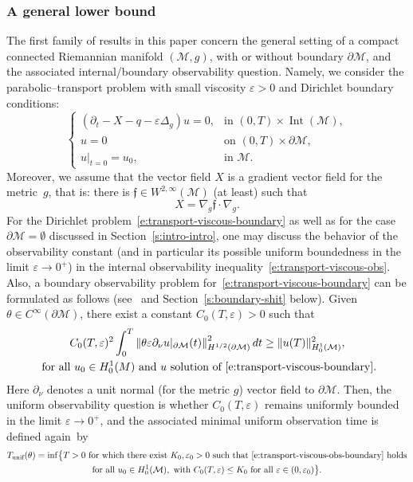 \documentclass[JEP,XML,SOM,Unicode]{cedram}
\newcommand{\unif}{\textup{unif}}
\theoremstyle{definition}
\newcommand{\M}{\ensuremath{\mathcal M}}
\newcommand{\f}{\ensuremath{\mathfrak{f}}}
\DeclareMathOperator{\Int}{Int}
\newcommand\nor[2]{\left\|#1\right\|_{#2}}
\let\d\partial
\let\eps\varepsilon
\let\q q
\begin{document}
\subsubsection{A general lower bound}
\label{s:sect-general}
The first family of results in this paper concern the general setting of a compact connected Riemannian manifold $(\M,g)$, with or without boundary $\d\M$, and the associated internal/boundary observability question. Namely, we consider the parabolic--transport problem with small viscosity $\eps>0$ and Dirichlet boundary conditions:
\begin{equation}
\label{e:transport-viscous-boundary}
\begin{cases}
(\d_t - X -\q - \eps \Delta_g ) u = 0, & \text{in } (0,T)\times\Int(\M), \\
u = 0 & \text{on } (0,T)\times \d\M, \\
u|_{t=0} = u_0, & \text{in } \M.
\end{cases}
\end{equation}
Moreover, we assume that the vector field $X$ is a gradient vector field for the metric~$g$, that is: there is $\f \in W^{2,\infty}(\M)$ (at least) such that
\[
X = \nabla_g \f \cdot \nabla_g.
\]
For the Dirichlet problem~\eqref{e:transport-viscous-boundary} as well as for the case $\d\M =\emptyset$ discussed in Section~\ref{s:intro-intro}, one may discuss the behavior of the observability constant (and in particular its possible uniform boundedness in the limit $\eps\to 0^+$) in the internal observability inequality~\eqref{e:transport-viscous-obs}.
Also, a boundary observability problem for~\eqref{e:transport-viscous-boundary} can be formulated as follows (see~\cite{GL:07} and Section~\ref{s:boundary-shit} below). Given $\theta \in C^\infty(\d\M)$, there exist a constant $C_0(T,\eps)>0$ such that
\begin{multline}
\label{e:transport-viscous-obs-boundary}
C_0(T,\eps)^2 \int_0^T\nor{ \theta \eps \d_{\nu} u|_{\d\M}(t)}{H^{1/2}(\d\M)}^2 dt \geq \|u (T)\|_{H^1_0(\M)}^2, \\
\text{ for all } u_0 \in H^1_0(M) \text{ and } u \text{ solution of~\eqref{e:transport-viscous-boundary}}.
\end{multline}
Here $\d_\nu$ denotes a unit normal (for the metric $g$) vector field to $\d\M$.
Then, the uniform observability question is whether $C_0(T,\eps)$ remains uniformly bounded in the limit $\eps\to 0^+$, and the associated minimal uniform observation time is defined again~by
\begin{multline*}
T_{\unif}(\theta) = \inf \bigl\{ T >0 \text{ for which there exist }K_0, \eps_0>0 \text{ such that~\eqref{e:transport-viscous-obs-boundary} holds}\\
\text {for all }u_0\in H^1_0(\M), \text{ with }C_0(T,\eps)\leq K_0 \text{ for all } \eps \in (0,\eps_0) \bigr\}.
\end{multline*}
\end{document}
